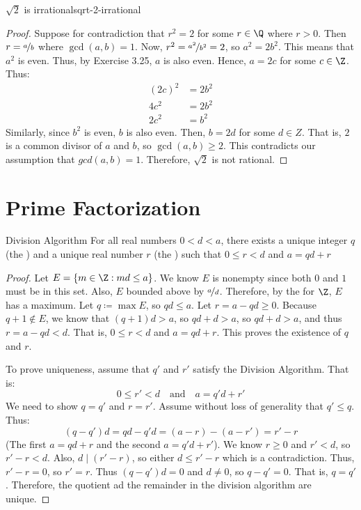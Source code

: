 \documentclass[letterpaper,12pt]{report}
\begin{document}
\begin{exbox}{$\sqrt{2}$ is irrational}{sqrt-2-irrational}
    \begin{proof}
        Suppose for contradiction that $r^2 = 2$ for some $r \in \Q$ where $r > 0$. Then $r = \nicefrac{a}{b}$ where $\gcd(a,b)=1$. Now, $r^2 = \nicefrac{a^2}{b^2} = 2$, so $a^2 = 2b^2$. This means that $a^2$ is even. Thus, by Exercise 3.25, $a$ is also even. Hence, $a=2c$ for some $c \in \Z$. Thus:
        \begin{align*}
            (2c)^2 &= 2b^2 \\
            4c^2 &= 2b^2 \\
            2c^2 &= b^2
        \end{align*}
        Similarly, since $b^2$ is even, $b$ is also even. Then, $b=2d$ for some $d \in Z$. That is, $2$ is a common divisor of $a$ and $b$, so $\gcd(a,b) \geq 2$. This contradicts our assumption that $gcd(a,b) = 1$. Therefore, $\sqrt{2}$ is not rational.
    \end{proof}
\end{exbox}

\section{Prime Factorization}

\begin{thmbox}{Division Algorithm}{}
    For all real numbers $0<d<a$, there exists a unique integer $q$ (the ) and a unique real number $r$ (the ) such that $0 \leq r < d$ and $a = qd + r$
    \tcblower
    \begin{proof}
        Let $E = \left\{ m \in \Z : md \leq a \right\}$. We know $E$ is nonempty since both $0$ and $1$ must be in this set. Also, $E$ bounded above by $\nicefrac{a}{d}$. Therefore, by the  for $\Z$, $E$ has a maximum. Let $q \coloneq \max E$, so $qd \leq a$. Let $r = a-qd \geq 0$. Because $q+1 \not \in E$, we know that $(q+1)d > a$, so $qd+d > a$, so $qd+d>a$, and thus $r = a-qd < d$. That is, $0 \leq r < d$ and $a = qd+r$. This proves the existence of $q$ and $r$.

        To prove uniqueness, assume that $q\prime$ and $r\prime$ satisfy the Division Algorithm. That is:
        \[ 0 \leq r\prime < d \quad \text{and} \quad a = q\prime d + r\prime\]
        We need to show $q = q\prime$ and $r = r\prime$. Assume without loss of generality that $q\prime \leq q$. Thus:
        $$(q - q\prime)d = qd - q\prime d = (a-r) - (a-r\prime) = r\prime - r$$
        (The first $a=qd+r$ and the second $a = q\prime d + r\prime$). We know $r \geq 0$ and $r\prime < d$, so $r\prime - r < d$. Also, $d \mid (r\prime - r)$, so either $d \leq r\prime - r$ which is a contradiction. Thus, $r\prime - r = 0$, so $r \prime = r$. Thus $(q - q\prime)d = 0$ and $d \neq 0$, so $q - q \prime = 0$. That is, $q = q\prime$. Therefore, the quotient ad the remainder in the division algorithm are unique.
    \end{proof}
\end{thmbox}
\end{document}
